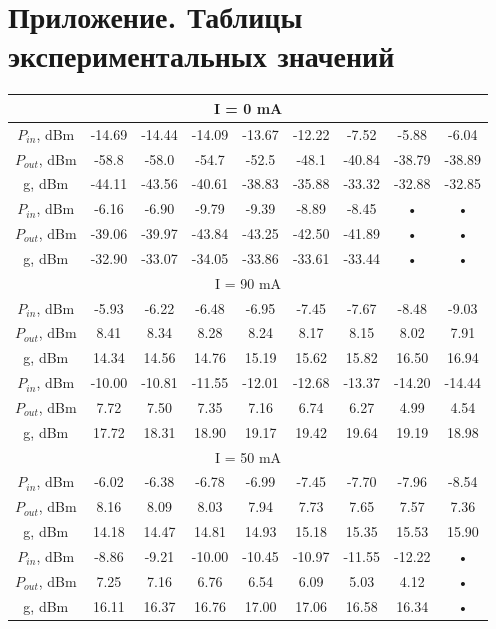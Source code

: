 \documentclass[12pt,a4paper]{article}
\begin{document}
\newpage

\section{Приложение. Таблицы экспериментальных значений}

\begin{tabular}{|c|c|c|c|c|c|c|c|c|}
\hline 
\multicolumn{9}{|c|}{I = 0 mA}  \\ 
\hline 
$P_{in}$, dBm & -14.69 & -14.44 & -14.09 & -13.67 & -12.22 & -7.52 & -5.88 & -6.04  \\ 
\hline 
$P_{out}$, dBm & -58.8 & -58.0 & -54.7 & -52.5 & -48.1 & -40.84 & -38.79 & -38.89  \\ 
\hline 
g, dBm & -44.11 & -43.56 & -40.61 & -38.83 & -35.88 & -33.32 & -32.88 & -32.85 \\ 
\hline 
$P_{in}$, dBm & -6.16 & -6.90 & -9.79 & -9.39 & -8.89 & -8.45 & • & • \\ 
\hline 
$P_{out}$, dBm & -39.06 & -39.97 & -43.84 & -43.25 & -42.50 & -41.89 & • & • \\ 
\hline 
g, dBm & -32.90 & -33.07 & -34.05 & -33.86 & -33.61 & -33.44 & • & • \\ 
\hline 
\multicolumn{9}{|c|}{I = 90 mA}\\ 
\hline 
$P_{in}$, dBm & -5.93 & -6.22 & -6.48 & -6.95 & -7.45 & -7.67 & -8.48 & -9.03 \\ 
\hline 
$P_{out}$, dBm & 8.41 & 8.34 & 8.28 & 8.24 & 8.17 & 8.15 & 8.02 & 7.91 \\ 
\hline 
g, dBm & 14.34 & 14.56 & 14.76 & 15.19 & 15.62 & 15.82 & 16.50 & 16.94 \\ 
\hline 
$P_{in}$, dBm &  -10.00 & -10.81 & -11.55 & -12.01 & -12.68 & -13.37 & -14.20 & -14.44 \\ 
\hline 
$P_{out}$, dBm & 7.72 & 7.50 & 7.35 & 7.16 & 6.74 & 6.27 & 4.99 & 4.54 \\ 
\hline 
g, dBm & 17.72 & 18.31 & 18.90 & 19.17 & 19.42 & 19.64 & 19.19 & 18.98 \\ 
\hline 
\multicolumn{9}{|c|}{I = 50 mA} \\ 
\hline 
$P_{in}$, dBm & -6.02 & -6.38 & -6.78 & -6.99 & -7.45 & -7.70 & -7.96 & -8.54  \\ 
\hline 
$P_{out}$, dBm & 8.16 & 8.09 & 8.03 & 7.94 & 7.73 & 7.65 & 7.57 & 7.36 \\ 
\hline 
g, dBm & 14.18 & 14.47 & 14.81 & 14.93 & 15.18 & 15.35 & 15.53 & 15.90  \\ 
\hline 
$P_{in}$, dBm & -8.86 & -9.21 & -10.00 & -10.45 & -10.97 & -11.55 & -12.22 & • \\ 
\hline 
$P_{out}$, dBm & 7.25 & 7.16 & 6.76 & 6.54 & 6.09 & 5.03 & 4.12 & • \\ 
\hline 
g, dBm & 16.11 & 16.37 & 16.76 & 17.00 & 17.06 & 16.58 & 16.34 & • \\ 
\hline 
\end{tabular} 
\end{document}
